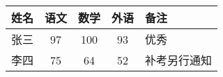 \documentclass{ctexart}
\begin{document}
    \begin{tabular}{|l ||  c | c | c | p{1.5cm} |}
        \hline
        姓名 & 语文 & 数学 & 外语 & 备注        \\
        \hline \hline
        张三 & 97   & 100 & 93  & 优秀      \\
        \hline
        李四 & 75   & 64  & 52  & 补考另行通知  \\
        \hline
    \end{tabular}
\end{document}
